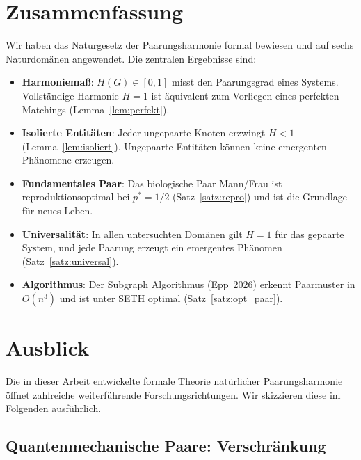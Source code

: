 ﻿\documentclass[a4paper,12pt]{article}
\theoremstyle{definition}
\begin{document}
\section{Zusammenfassung}

Wir haben das Naturgesetz der Paarungsharmonie formal bewiesen und auf sechs
Naturdomänen angewendet. Die zentralen Ergebnisse sind:

\begin{itemize}
	\item \textbf{Harmoniemaß}: $H(G) \in [0,1]$ misst den Paarungsgrad eines Systems.
	Vollständige Harmonie $H = 1$ ist äquivalent zum Vorliegen eines perfekten Matchings
	(Lemma~\ref{lem:perfekt}).
	
	\item \textbf{Isolierte Entitäten}: Jeder ungepaarte Knoten erzwingt $H < 1$
	(Lemma~\ref{lem:isoliert}). Ungepaarte Entitäten können keine emergenten
	Phänomene erzeugen.
	
	\item \textbf{Fundamentales Paar}: Das biologische Paar Mann/Frau ist
	reproduktionsoptimal bei $p^* = 1/2$ (Satz~\ref{satz:repro}) und ist die
	Grundlage für neues Leben.
	
	\item \textbf{Universalität}: In allen untersuchten Domänen gilt $H = 1$ für
	das gepaarte System, und jede Paarung erzeugt ein emergentes Phänomen
	(Satz~\ref{satz:universal}).
	
	\item \textbf{Algorithmus}: Der Subgraph Algorithmus (Epp~2026) erkennt
	Paarmuster in $O(n^3)$ und ist unter SETH optimal (Satz~\ref{satz:opt_paar}).
\end{itemize}

\section{Ausblick}
\label{sec:ausblick}

Die in dieser Arbeit entwickelte formale Theorie natürlicher Paarungsharmonie
öffnet zahlreiche weiterführende Forschungsrichtungen. Wir skizzieren diese im
Folgenden ausführlich.

\subsection{Quantenmechanische Paare: Verschränkung}
\end{document}
